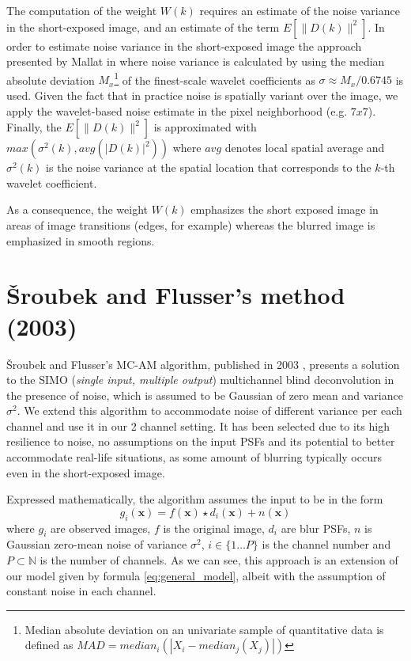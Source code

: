 \documentclass[12pt,notitlepage]{report}
\begin{document}
The computation of the weight $W(k)$ requires an estimate of the noise variance in the short-exposed image, and an estimate of the term $E[\|D(k)\|^2]$.  In order to estimate noise variance in the short-exposed image the approach presented by Mallat in \cite{mall09} where noise variance is calculated by using the median absolute deviation $M_x$\footnote[5]{Median absolute deviation on an univariate sample of quantitative data is defined as $MAD = median_i( | X_i - median_j(X_j)|) $} of the finest-scale wavelet coefficients  as $\sigma \approx M_x/0.6745$ is used. Given the fact that in practice noise is spatially variant over the image, we apply the wavelet-based noise estimate in the pixel neighborhood (e.g. $7x7$). Finally, the $E[\|D(k)\|^2]$ is approximated with $max(\sigma^2(k),avg(|D(k)|^2))$ where $avg$ denotes local spatial average and $\sigma^2(k)$ is the noise variance at the spatial location that corresponds to the $k$-th wavelet coefficient.

As a consequence, the weight $W(k)$ emphasizes the short exposed image in areas of image transitions (edges, for example) whereas the blurred image is emphasized in smooth regions. 

\section{Šroubek and Flusser's method (2003)}
\label{sec:srou03}

Šroubek and Flusser's MC-AM algorithm, published in 2003 \cite{srou03}, presents a solution to the SIMO ({\em single input, multiple output}) multichannel blind deconvolution in the presence of noise, which is assumed to be Gaussian of zero mean and variance $\sigma^2$. We extend this algorithm to accommodate noise of different variance per each channel and use it in our 2 channel setting. It has been selected due to its high resilience to noise, no assumptions on the input PSFs and its potential to better accommodate real-life situations, as some amount of blurring typically occurs even in the short-exposed image. 

Expressed mathematically, the algorithm assumes the input to be in the form
\begin{equation}
\label{eq:srou03_general_model}
	g_i(\mathbf{x}) = f(\mathbf{x}) \star d_i(\mathbf{x}) + n(\mathbf{x}) 	
\end{equation}
where $g_i$ are observed images, $f$ is the original image, $d_i$ are blur PSFs, $n$ is Gaussian zero-mean noise of variance $\sigma^2$, $i \in \{1 \dots P\}$ is the channel number and $P \subset \mathbb{N}$ is the number of channels. As we can see, this approach is an extension of our model given by formula \ref{eq:general_model}, albeit with the assumption of constant noise in each channel. 
\end{document}
